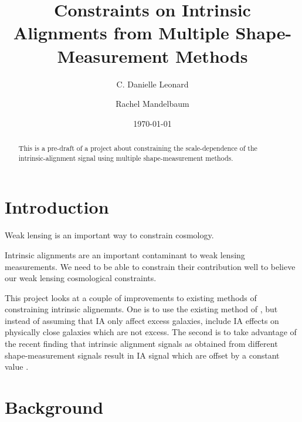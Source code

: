 \documentclass[twocolumn,amsmath,aps,fleqn, superscriptaddress]{revtex4}
\begin{document}
\title{{Constraints on Intrinsic Alignments from Multiple Shape-Measurement Methods}}

\author{C. Danielle Leonard}

\author{Rachel Mandelbaum}

\date{\today}

\begin{abstract}
This is a pre-draft of a project about constraining the scale-dependence of the intrinsic-alignment signal using multiple shape-measurement methods.
\end{abstract}


\maketitle


\section{Introduction}
\label{sec:introduction}
\noindent
Weak lensing is an important way to constrain cosmology.

Intrinsic alignments are an important contaminant to weak lensing measurements. We need to be able to constrain their contribution well to believe our weak lensing cosmological constraints.

This project looks at a couple of improvements to existing methods of constraining intrinsic alignemnts. One is to use the existing method of \cite{Blazek2012}, but instead of assuming that IA only affect excess galaxies, include IA effects on physically close galaxies which are not excess. The second is to take advantage of the recent finding that intrinsic alignment signals as obtained from different shape-measurement signals result in IA signal which are offset by a constant value \cite{Singh2016}. 

\section{Background}
\label{sec:theory}
\end{document}
